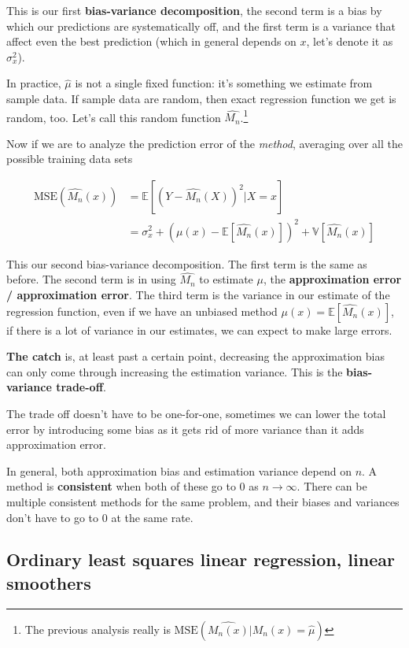 \documentclass{article}
\begin{document}
This is our first \textbf{bias-variance decomposition}, the second term is a bias by which our predictions are systematically off, and the first term is a variance that affect even the best prediction (which in general depends on $x$, let's denote it as $\sigma_x^2$).

In practice, $\hat{\mu}$ is not a single fixed function: it's something we estimate from sample data.
If sample data are random, then exact regression function we get is random, too.
Let's call this random function $\hat{M_n}$.\footnote{The previous analysis really is $\text{MSE}(\hat{M_n(x)} | \hat{M_n(x)} = \hat{\mu})$}

Now if we are to analyze the prediction error of the \textit{method}, averaging over all the possible training data sets

\begin{align*}
\text{MSE}(\hat{M_n}(x)) &= \mathbb{E}[(Y - \hat{M_n}(X))^2 | X = x] \\
                         &= \sigma_x^2 + (\mu(x) - \mathbb{E}[\hat{M_n}(x)])^2 + \mathbb{V}[\hat{M_n}(x)]
\end{align*}

This our second bias-variance decomposition.
The first term is the same as before.
The second term is in using $\hat{M_n}$ to estimate $\mu$, the \textbf{approximation error / approximation error}.
The third term is the variance in our estimate of the regression function, even if we have an unbiased method $\mu(x) = \mathbb{E}[\hat{M_n}(x)]$, if there is a lot of variance in our estimates, we can expect to make large errors.

\textbf{The catch} is, at least past a certain point, decreasing the approximation bias can only come through increasing the estimation variance.
This is the \textbf{bias-variance trade-off}.

The trade off doesn't have to be one-for-one, sometimes we can lower the total error by introducing some bias as it gets rid of more variance than it adds approximation error.

In general, both approximation bias and estimation variance depend on $n$.
A method is \textbf{consistent} when both of these go to 0 as $n \to \infty$.
There can be multiple consistent methods for the same problem, and their biases and variances don't have to go to 0 at the same rate.


\subsection{Ordinary least squares linear regression, linear smoothers}
\end{document}

